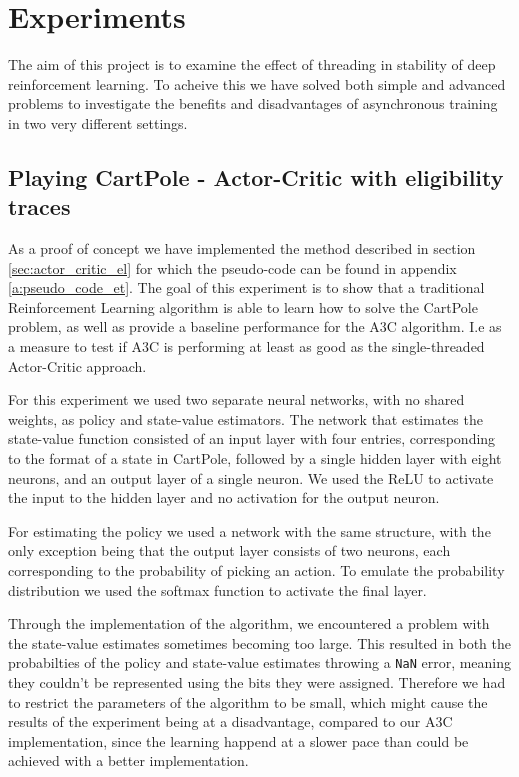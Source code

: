\documentclass[11pt]{article}
\begin{document}

\section{Experiments}

The aim of this project is to examine the effect of threading
in stability of deep reinforcement learning.
To acheive this we have solved both simple and advanced problems to investigate
the benefits and disadvantages of asynchronous training in two very different
settings.

\subsection{Playing CartPole - Actor-Critic with eligibility traces}

As a proof of concept we have implemented the method described in section
\ref{sec:actor_critic_el} for which the pseudo-code
can be found in appendix \ref{a:pseudo_code_et}.
The goal of this experiment is to show that a 
traditional Reinforcement Learning algorithm
is able to learn how to solve the CartPole problem, as well as provide a
baseline performance for the A3C algorithm.
I.e as a measure to test if A3C is performing at least as good
as the single-threaded Actor-Critic approach.

For this experiment we used two separate neural networks, with no
shared weights, as policy and state-value estimators.
The network that estimates the state-value function consisted of an
input layer with four entries, corresponding to the format of a state in CartPole,
followed by a single hidden layer with eight neurons, and an output layer of a single
neuron.
We used the ReLU to activate the input to the
hidden layer and no activation for the output neuron.

For estimating the policy we used a network with the same structure,
with the only exception being that the output layer consists of two
neurons, each corresponding to the probability of picking an action.
To emulate the probability distribution we used the softmax function
to activate the final layer.

Through the implementation of the algorithm, we encountered a problem with
the state-value estimates sometimes becoming too large.
This resulted in both the probabilties of the policy and state-value estimates throwing a \texttt{NaN} error,
meaning they couldn't be represented using the bits they were assigned.
Therefore we had to restrict the parameters of the algorithm to
be small, which might cause the results of the
experiment being at a disadvantage, compared to our A3C implementation, since the learning happend
at a slower pace than could be achieved with a better implementation.
\end{document}
